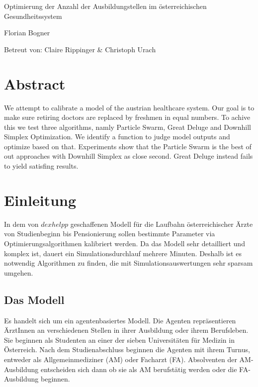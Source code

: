 \documentclass[a4paper,12pt]{article}
\begin{document}
\begin{titlepage}
\huge
\centering
Optimierung der Anzahl der Ausbildungstellen im österreichischen Gesundheitssystem 

\vfill

\normalsize
Florian Bogner

Betreut von: Claire Rippinger \& Christoph Urach
\end{titlepage}




\tableofcontents
\newpage

\section{Abstract}

We attempt to calibrate a model of the austrian healthcare system. Our goal is to make sure retiring doctors are replaced by freshmen in equal numbers. To achive this we test three algorithms, namly Particle Swarm, Great Deluge and Downhill Simplex Optimization. We identify a function to judge model outputs and optimize based on that. Experiments show that the Particle Swarm is the best of out approaches with Downhill Simplex as close second. Great Deluge instead fails to yield satisfing results.

\section{Einleitung}

In dem von $dexhelpp$ geschaffenen Modell für die Laufbahn österreichischer Ärzte von Studienbeginn bis Pensionierung sollen bestimmte Parameter via Optimierungsalgorithmen kalibriert werden. Da das Modell sehr detailliert und komplex ist, dauert ein Simulationsdurchlauf mehrere Minuten. Deshalb ist es notwendig Algorithmen zu finden, die mit Simulationsauswertungen sehr sparsam umgehen. 

\subsection{Das Modell}

Es handelt sich um ein agentenbasiertes Modell. Die Agenten repräsentieren ÄrztInnen an verschiedenen Stellen in ihrer Ausbildung oder ihrem Berufsleben. Sie beginnen als Studenten an einer der sieben Universitäten für Medizin in Österreich. Nach dem Studienabschluss beginnen die Agenten mit ihrem Turnus, entweder als Allgemeinmediziner (AM) oder Facharzt (FA). Absolventen der AM-Ausbildung entscheiden sich dann ob sie als AM berufstätig werden oder die FA-Ausbildung beginnen. 
\end{document}
